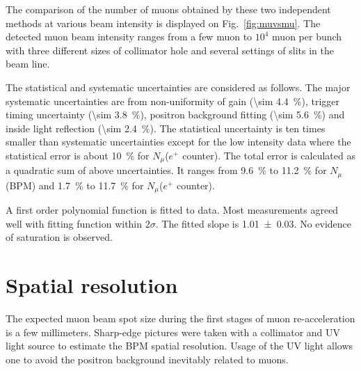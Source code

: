 \documentclass[preprint,3p,twocolumn]{elsarticle}
\begin{document}
The comparison of the number of muons obtained by these two
independent methods at various beam intensity is displayed on
Fig.~\ref{fig:muvsmu}. The detected muon beam intensity ranges
from a few muon to $10^{4}$ muon per bunch with three different
sizes of collimator hole and several settings of slits in the
beam line.

The statistical and systematic uncertainties are considered as
follows. The major systematic uncertainties are from
non-uniformity of gain (\SI{\sim 4.4}{\percent}), trigger timing
uncertainty (\SI{\sim 3.8}{\percent}), positron background
fitting (\SI{\sim 5.6}{\percent}) and inside light reflection
(\SI{\sim 2.4}{\percent}).  The statistical uncertainty is ten
times smaller than systematic uncertainties except for the low
intensity data where the statistical error is about
\SI{10}{\percent} for $N_\mu$($e^+$ counter).  The total error
is calculated as a quadratic sum of above uncertainties. It
ranges from \SI{9.6}{\percent} to \SI{11.2}{\percent} for 
$N_\mu$(BPM) and \SI{1.7}{\percent} to \SI{11.7}{\percent} for 
$N_\mu$($e^+$ counter).

A first order polynomial function is fitted to data.  Most
measurements agreed well with fitting function within $2\sigma$.
The fitted slope is \num{1.01 \pm 0.03}. No evidence of
saturation is observed.

\section{Spatial resolution}
 
The expected muon beam spot size during the first stages of muon
re-acceleration is a few millimeters.  Sharp-edge pictures were
taken with a collimator and UV light source to estimate the BPM
spatial resolution.  Usage of the UV light allows one to avoid
the positron background inevitably related to muons.
\end{document}
